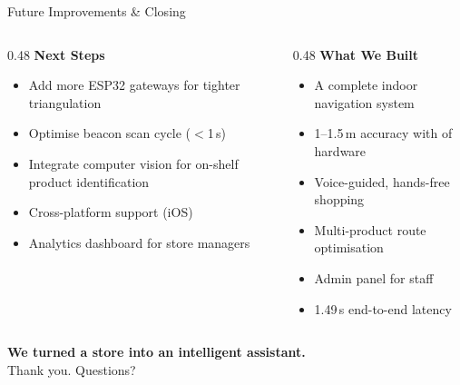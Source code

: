 \documentclass[aspectratio=169,12pt]{beamer}
\begin{document}
\begin{frame}{Future Improvements \& Closing}
\begin{columns}[T]
\begin{column}{0.48\textwidth}
\textbf{Next Steps}
\begin{itemize}
    \item Add more ESP32 gateways for tighter triangulation
    \item Optimise beacon scan cycle ($<$1\,s)
    \item Integrate computer vision for on-shelf product identification
    \item Cross-platform support (iOS)
    \item Analytics dashboard for store managers
\end{itemize}
\end{column}
\begin{column}{0.48\textwidth}
\textbf{What We Built}
\begin{itemize}
    \item A complete indoor navigation system
    \item 1--1.5\,m accuracy with  of hardware
    \item Voice-guided, hands-free shopping
    \item Multi-product route optimisation
    \item Admin panel for staff
    \item 1.49\,s end-to-end latency
\end{itemize}
\end{column}
\end{columns}
\vspace{1.5em}
\begin{center}
\Large\textbf{We turned a store into an intelligent assistant.}\\[0.5em]
\normalsize Thank you. Questions?
\end{center}
\end{frame}
\end{document}

